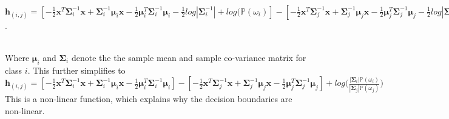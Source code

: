                                                                                         \\ \vspace{5mm}

                                                                                        $\bm{h}_{(i,j)} = [-\frac{1}{2}\bm{x}^T\bm{\Sigma}_{i}^{-1}\bm{x} + \bm{\Sigma}_{i}^{-1}\bm{\mu}_{i}\bm{x} - \frac{1}{2}\bm{\mu}_{i}^{T} \bm{\Sigma}_{i}^{-1} \bm{\mu}_{i} - \frac{1}{2} log | \bm{\Sigma}_{i}^{-1} | + log(\mathbb{P}( \omega_{i}) ] - [-\frac{1}{2}\bm{x}^T\bm{\Sigma}_{j}^{-1}\bm{x} + \bm{\Sigma}_{j}^{-1}\bm{\mu}_{j}\bm{x} - \frac{1}{2}\bm{\mu}_{j}^{T} \bm{\Sigma}_{j}^{-1}
                                                                                        \bm{\mu}_{j} - \frac{1}{2} log | \bm{\Sigma}_{j}^{-1} | + log(\mathbb{P}( \omega_{j}) ]$.\cite{bigformula} 

                                                                                        \\ \vspace{5mm}
                                                                                        Where $\bm{\mu}_i$ and $\bm{\Sigma}_i$ denote the the sample mean and sample co-variance matrix for class $i$. This further simplifies to 
                                                                                        \\
                                                                                        $\bm{h}_{(i,j)} = [-\frac{1}{2}\bm{x}^T\bm{\Sigma}_{i}^{-1}\bm{x} + \bm{\Sigma}_{i}^{-1}\bm{\mu}_{i}\bm{x} - \frac{1}{2}\bm{\mu}_{i}^{T} \bm{\Sigma}_{i}^{-1} \bm{\mu}_{i}] - [-\frac{1}{2}\bm{x}^T\bm{\Sigma}_{j}^{-1}\bm{x} + \bm{\Sigma}_{j}^{-1}\bm{\mu}_{j}\bm{x} - \frac{1}{2}\bm{\mu}_{j}^{T} \bm{\Sigma}_{j}^{-1} \bm{\mu}_{j}] + log \Big( \frac{|\bm{\Sigma}_{i}| \mathbb{P}(
                                                                                        \omega_{i})}{|\bm{\Sigma}_{j}| \mathbb{P}( \omega_{j})} \Big)$
                                                                                        \\ \vspace{5mm}
                                                                                        This is a non-linear function,\cite{bigformula} which explains why the decision boundaries are non-linear.

                                                                                        \\ \vspace{5mm}


